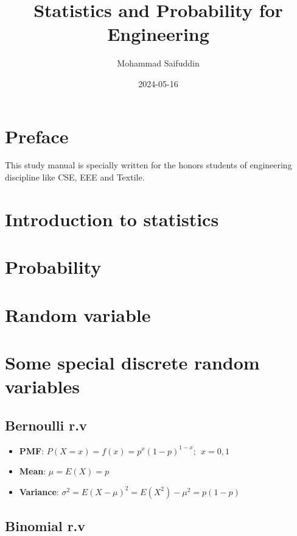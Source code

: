 \documentclass[
]{article}
\title{Statistics and Probability for Engineering}
\author{Mohammad Saifuddin}
\date{2024-05-16}
\providecommand{\tightlist}{%
  \setlength{\itemsep}{0pt}\setlength{\parskip}{0pt}}
\begin{document}
\maketitle

{
\setcounter{tocdepth}{2}
\tableofcontents
}
\section*{Preface}\label{preface}

This study manual is specially written for the honors students of engineering discipline like CSE, EEE and Textile.

\section{Introduction to statistics}\label{introduction-to-statistics}

\section{Probability}\label{probability}

\section{Random variable}\label{random-variable}

\section{Some special discrete random variables}\label{some-special-discrete-random-variables}

\subsection{Bernoulli r.v}\label{bernoulli-r.v}

\begin{itemize}
\tightlist
\item
  \textbf{PMF}: \(P(X=x)=f(x)=p^x(1-p)^{1-x}; \ \ x=0,1\)
\item
  \textbf{Mean}: \(\mu=E(X)=p\)
\item
  \textbf{Variance}: \(\sigma^2 =E(X-\mu)^2=E(X^2)-\mu^2=p(1-p)\)
\end{itemize}

\subsection{Binomial r.v}\label{binomial-r.v}
\end{document}
